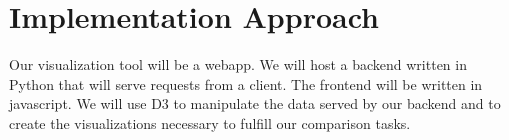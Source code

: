 \section{Implementation Approach}

Our visualization tool will be a webapp. We will host a backend written in Python that 
will serve requests from a client. The frontend will be written in javascript. We will use D3 to manipulate the data served
by our backend and to create the visualizations necessary to fulfill our comparison tasks.